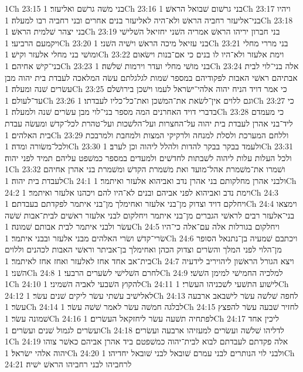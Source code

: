 1Ch 23:15  בני משׁה גרשׁם ואליעזר׃
1Ch 23:16  בני גרשׁום שׁבואל הראשׁ׃
1Ch 23:17  ויהיו בני־אליעזר רחביה הראשׁ ולא־היה לאליעזר בנים אחרים ובני רחביה רבו למעלה׃
1Ch 23:18  בני יצהר שׁלמית הראשׁ׃
1Ch 23:19  בני חברון יריהו הראשׁ אמריה השׁני יחזיאל השׁלישׁי ויקמעם הרביעי׃
1Ch 23:20  בני עזיאל מיכה הראשׁ וישׁיה השׁני׃
1Ch 23:21  בני מררי מחלי ומושׁי בני מחלי אלעזר וקישׁ׃
1Ch 23:22  וימת אלעזר ולא־היו לו בנים כי אם־בנות וישׂאום בני־קישׁ אחיהם׃
1Ch 23:23  בני מושׁי מחלי ועדר וירמות שׁלשׁה׃
1Ch 23:24  אלה בני־לוי לבית אבתיהם ראשׁי האבות לפקודיהם במספר שׁמות לגלגלתם עשׂה המלאכה לעבדת בית יהוה מבן עשׂרים שׁנה ומעלה׃
1Ch 23:25  כי אמר דויד הניח יהוה אלהי־ישׂראל לעמו וישׁכן בירושׁלם עד־לעולם׃
1Ch 23:26  וגם ללוים אין־לשׂאת את־המשׁכן ואת־כל־כליו לעבדתו׃
1Ch 23:27  כי בדברי דויד האחרנים המה מספר בני־לוי מבן עשׂרים שׁנה ולמעלה׃
1Ch 23:28  כי מעמדם ליד־בני אהרן לעבדת בית יהוה על־החצרות ועל־הלשׁכות ועל־טהרת לכל־קדשׁ ומעשׂה עבדת בית האלהים׃
1Ch 23:29  וללחם המערכת ולסלת למנחה ולרקיקי המצות ולמחבת ולמרבכת ולכל־משׂורה ומדה׃
1Ch 23:30  ולעמד בבקר בבקר להדות ולהלל ליהוה וכן לערב׃
1Ch 23:31  ולכל העלות עלות ליהוה לשׁבתות לחדשׁים ולמעדים במספר כמשׁפט עליהם תמיד לפני יהוה׃
1Ch 23:32  ושׁמרו את־משׁמרת אהל־מועד ואת משׁמרת הקדשׁ ומשׁמרת בני אהרן אחיהם לעבדת בית יהוה׃
1Ch 24:1  ולבני אהרן מחלקותם בני אהרן נדב ואביהוא אלעזר ואיתמר׃
1Ch 24:2  וימת נדב ואביהוא לפני אביהם ובנים לא־היו להם ויכהנו אלעזר ואיתמר׃
1Ch 24:3  ויחלקם דויד וצדוק מן־בני אלעזר ואחימלך מן־בני איתמר לפקדתם בעבדתם׃
1Ch 24:4  וימצאו בני־אלעזר רבים לראשׁי הגברים מן־בני איתמר ויחלקום לבני אלעזר ראשׁים לבית־אבות שׁשׁה עשׂר ולבני איתמר לבית אבותם שׁמונה׃
1Ch 24:5  ויחלקום בגורלות אלה עם־אלה כי־היו שׂרי־קדשׁ ושׂרי האלהים מבני אלעזר ובבני איתמר׃
1Ch 24:6  ויכתבם שׁמעיה בן־נתנאל הסופר מן־הלוי לפני המלך והשׂרים וצדוק הכהן ואחימלך בן־אביתר וראשׁי האבות לכהנים וללוים בית־אב אחד אחז לאלעזר ואחז אחז לאיתמר׃
1Ch 24:7  ויצא הגורל הראשׁון ליהויריב לידעיה השׁני׃
1Ch 24:8  לחרם השׁלישׁי לשׂערים הרבעי׃
1Ch 24:9  למלכיה החמישׁי למימן השׁשׁי׃
1Ch 24:10  להקוץ השׁבעי לאביה השׁמיני׃
1Ch 24:11  לישׁוע התשׁעי לשׁכניהו העשׂרי׃
1Ch 24:12  לאלישׁיב עשׁתי עשׂר ליקים שׁנים עשׂר׃
1Ch 24:13  לחפה שׁלשׁה עשׂר לישׁבאב ארבעה עשׂר׃
1Ch 24:14  לבלגה חמשׁה עשׂר לאמר שׁשׁה עשׂר׃
1Ch 24:15  לחזיר שׁבעה עשׂר להפצץ שׁמונה עשׂר׃
1Ch 24:16  לפתחיה תשׁעה עשׂר ליחזקאל העשׂרים׃
1Ch 24:17  ליכין אחד ועשׂרים לגמול שׁנים ועשׂרים׃
1Ch 24:18  לדליהו שׁלשׁה ועשׂרים למעזיהו ארבעה ועשׂרים׃
1Ch 24:19  אלה פקדתם לעבדתם לבוא לבית־יהוה כמשׁפטם ביד אהרן אביהם כאשׁר צוהו יהוה אלהי ישׂראל׃
1Ch 24:20  ולבני לוי הנותרים לבני עמרם שׁובאל לבני שׁובאל יחדיהו׃
1Ch 24:21  לרחביהו לבני רחביהו הראשׁ ישׁיה׃
